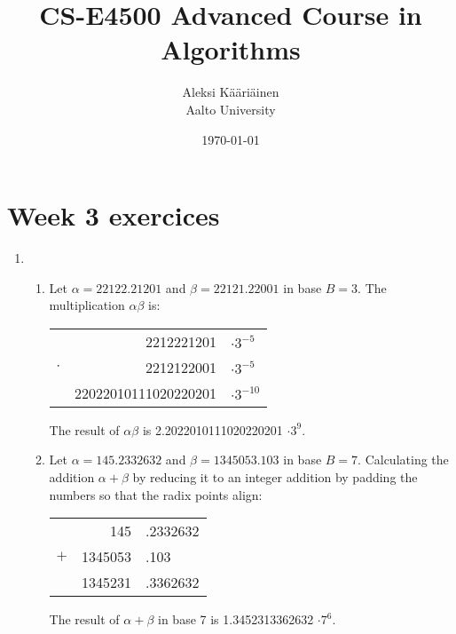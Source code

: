 \documentclass[11pt,a4paper]{article}
\title{CS-E4500 Advanced Course in Algorithms}
\author{Aleksi Kääriäinen  \\
	Aalto University  \\
	}
\begin{document}
\date{\today}

\maketitle

\newpage

\section*{Week 3 exercices}

\begin{enumerate}
    \item
          \begin{enumerate}
              \item Let $\alpha= 22122.21201$ and $\beta = 22121.22001$ in base $B = 3$. The multiplication $\alpha \beta$ is:
                    \begin{center}
                        \begin{tabular}{crl}
                                    & 2212221201 & $\cdot 3^{-5}$      \\
                            $\cdot$ & 2212122001 & $\cdot 3^{-5}$     \\
                            \hline
                                    & 22022010111020220201 & $\cdot 3^{-10}$\\
                        \end{tabular}
                    \end{center}
                    The result of $\alpha \beta$ is 2.2022010111020220201 $\cdot 3^{9}$.

              \item Let $\alpha = 145.2332632$ and $\beta = 1345053.103$ in base $B = 7$. Calculating the addition $\alpha + \beta$
                    by reducing it to an integer addition by padding the numbers so that the radix points align:
                    \begin{center}
                        \begin{tabular}{crl}
                                & 145     & .2332632 \\
                            $+$ & 1345053 & .103     \\
                            \hline
                                & 1345231 & .3362632 \\
                        \end{tabular}
                    \end{center}
                    The result of $\alpha + \beta$ in base 7 is 1.3452313362632 $\cdot 7^{6}$.
          \end{enumerate}
          \newpage


\end{enumerate}
\end{document}
